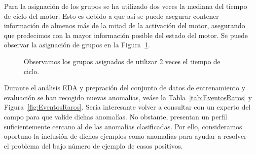 \documentclass[12pt,letterpaper]{article}
\begin{document}
Para la asignación de los grupos se ha utilizado dos veces la mediana del tiempo de ciclo del motor. 
Esto es debido a que así se puede asegurar contener información de almenos más de la mitad de la activación del motor, asegurando que predecimos con la mayor información posible del estado del motor.
Se puede observar la asignación de grupos en la Figura~\ref{fig:VentanaDeslizante}.

\begin{figure}[htp]
        \centering
        \caption{Observamos los grupos asignados de utilizar 2 veces el tiempo de ciclo.}
        \label{fig:VentanaDeslizante}
\end{figure}


Durante el análisis EDA y prepración del conjunto de datos de entrenamiento y evaluación se han recogido nuevas anomalías, veáse la Tabla~\ref{tab:EventosRaros} y Figura~\ref{fig:EventosRaros}.
Sería interesante volver a consultar con un experto del campo para que valide dichas anomalías. No obstante, presentan un perfil suficientemente cercano al de las anomalías clasificadas.
Por ello, consideramos oportuno la inclusión de dichos ejemplos como anomalías para ayudar a resolver el problema del bajo número de ejemplo de casos positivos.
\end{document}
